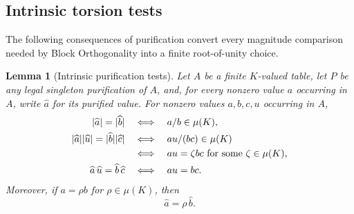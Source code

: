 \documentclass[11pt]{article}
\theoremstyle{plain}
\newtheorem{lemma}[lemma]{Lemma}
\theoremstyle{definition}
\theoremstyle{remark}
\DeclarePairedDelimiter{\abs}{\lvert}{\rvert}
\begin{document}
\subsection{Intrinsic torsion tests}

The following consequences of purification convert every magnitude
comparison needed by Block Orthogonality into a finite root-of-unity choice.

\begin{lemma}[Intrinsic purification tests]
\label{lem:intrinsic-purification-tests}
Let $A$ be a finite $K$-valued table, let $P$ be any legal singleton
purification of $A$, and, for every nonzero value $a$ occurring in $A$,
write $\widehat a$ for its purified value.  For nonzero values $a,b,c,u$
occurring in $A$,
\begin{align}
  \abs{\widehat a}=\abs{\widehat b}
  &\quad\Longleftrightarrow\quad
  a/b\in\mu(K),
  \label{eq:intrinsic-equal-magnitude}\\
  \abs{\widehat a}\abs{\widehat u}
     =\abs{\widehat b}\abs{\widehat c}
  &\quad\Longleftrightarrow\quad
  au/(bc)\in\mu(K)\notag\\
  &\quad\Longleftrightarrow\quad
  au=\zeta bc
  \text{ for some }\zeta\in\mu(K),
  \label{eq:intrinsic-magnitude-minor}\\
  \widehat a\,\widehat u=\widehat b\,\widehat c
  &\quad\Longleftrightarrow\quad
  au=bc.
  \label{eq:intrinsic-ordinary-minor}
\end{align}
Moreover, if $a=\rho b$ for $\rho\in\mu(K)$, then
\begin{equation}
  \widehat a=\rho\,\widehat b.
  \label{eq:purification-root-covariance}
\end{equation}
\end{lemma}
\end{document}
